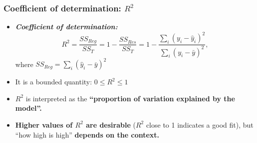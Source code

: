 \documentclass[10pt]{beamer} %
\begin{document}
\begin{frame}
	\frametitle{Coefficient of determination: $R^2$ }
\begin{itemize}
		\item \emph{\textbf{Coefficient of determination:}}
$$R^2 = \frac{SS_{Reg}}{SS_{T}}  = 1 - \frac{SS_{Res}}{SS_{T}} = 1 - \frac{\sum_i (y_i - \hat y_i)^2}{\sum_i (y_i - \bar y)^2},$$
where $SS_{Reg} = \sum_i (\hat y_i - \bar y)^2$

%
\vspace{0.25cm}
\item It is a bounded quantity: \textbf{$0\le R^2 \le 1$}

\vspace{0.2cm}
		\item  $R^2$ is interpreted as the \textbf{``proportion of variation explained by the model''.}

\vspace{0.2cm}
\item \textbf{Higher values of $R^2$ are desirable} ($R^2$ close to 1 indicates a good fit), but ``how high is high'' \textbf{depends on the context.}
		\vspace{0.25cm}

\end{itemize}	
	
\end{frame}


% 	
\end{document}
